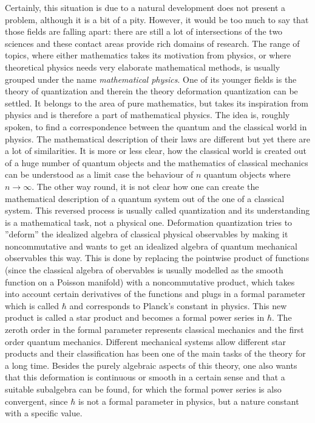 Certainly, this situation is due to a natural development does not present a 
problem, although it is a bit of a pity. However, it would be too much to say 
that those fields are falling apart: there are still a lot of intersections of 
the two sciences and these contact areas provide rich domains of research. The 
range of topics, where either mathematics takes its motivation from physics, 
or where theoretical physics needs very elaborate mathematical methods, is 
usually grouped under the name \emph{mathematical physics}. One of its younger 
fields is the theory of quantization and therein the theory deformation 
quantization can be settled. It belongs to the area of 
pure mathematics, but takes its inspiration from physics and is therefore a 
part of mathematical physics. The idea is, roughly spoken, to find a 
correspondence between the quantum and the classical world in physics. The 
mathematical description of their laws are different but yet there are a lot of 
similarities. It is more or less clear, how the classical world is created out 
of a huge number of quantum objects and the mathematics of classical mechanics 
can be understood as a limit case the behaviour of $n$ quantum objects where 
$n \longrightarrow \infty$. The other way round, it is not clear how one can 
create the mathematical description of a quantum system out of the one of a 
classical system. This reversed process is usually called quantization and its 
understanding is a mathematical task, not a physical one. Deformation 
quantization tries to ''deform'' the idealized algebra of classical physical 
observables by making it noncommutative and wants to get an idealized algebra 
of quantum mechanical observables this way. This is done by replacing the 
pointwise product of functions (since the classical algebra of obervables is 
usually modelled as the smooth function on a Poisson manifold) with a 
noncommutative product, which takes into account certain derivatives of the 
functions and plugs in a formal parameter which is called $\hbar$ and 
corresponds to Planck's constant in physics. This new product is called 
a star product and becomes a formal power series in $\hbar$. The zeroth order 
in the formal parameter represents classical mechanics and the first order 
quantum mechanics. Different mechanical systems allow different star products 
and their classification has been one of the main tasks of the theory for a 
long time. Besides the purely algebraic aspects of this theory, one also wants 
that this deformation is continuous or smooth in a certain sense and that a 
suitable subalgebra can be found, for which the formal power series is also 
convergent, since $\hbar$ is not a formal parameter in physics, but a nature 
constant with a specific value.


